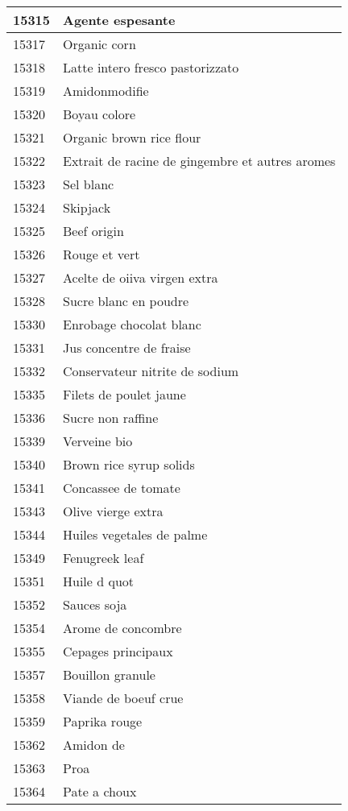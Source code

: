 \begin{longtable}{|l|l|}
15315 & Agente espesante \\ \hline 
15317 & Organic corn \\ \hline 
15318 & Latte intero fresco pastorizzato \\ \hline 
15319 & Amidonmodifie \\ \hline 
15320 & Boyau colore \\ \hline 
15321 & Organic brown rice flour \\ \hline 
15322 & Extrait de racine de gingembre et autres aromes \\ \hline 
15323 & Sel blanc \\ \hline 
15324 & Skipjack \\ \hline 
15325 & Beef origin \\ \hline 
15326 & Rouge et vert \\ \hline 
15327 & Acelte de oiiva virgen extra \\ \hline 
15328 & Sucre blanc en poudre \\ \hline 
15330 & Enrobage chocolat blanc \\ \hline 
15331 & Jus concentre de fraise \\ \hline 
15332 & Conservateur nitrite de sodium \\ \hline 
15335 & Filets de poulet jaune \\ \hline 
15336 & Sucre non raffine \\ \hline 
15339 & Verveine bio \\ \hline 
15340 & Brown rice syrup solids \\ \hline 
15341 & Concassee de tomate \\ \hline 
15343 & Olive vierge extra \\ \hline 
15344 & Huiles vegetales de palme \\ \hline 
15349 & Fenugreek leaf \\ \hline 
15351 & Huile d quot \\ \hline 
15352 & Sauces soja \\ \hline 
15354 & Arome de concombre \\ \hline 
15355 & Cepages principaux \\ \hline 
15357 & Bouillon granule \\ \hline 
15358 & Viande de boeuf crue \\ \hline 
15359 & Paprika rouge \\ \hline 
15362 & Amidon de \\ \hline 
15363 & Proa \\ \hline 
15364 & Pate a choux \\ \hline 

\end{longtable}
